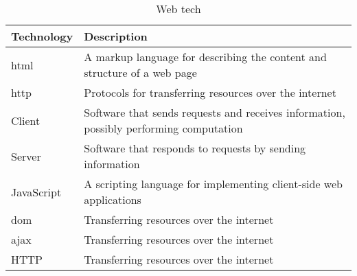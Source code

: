 \begin{table}[H]
	\caption{
		Web tech
	}
	\label{tab:web tech}
	\centering
	\begin{tabular}{ | L{0.2\textwidth} | L{0.7\textwidth} | }
		\hline
		\textbf{Technology}
		& \textbf{Description} \\
		\hline
		\hline
		\acrshort{html}
		& A markup language for describing the content and structure of a web page \\
		\hline
		\acrshort{http}
		& Protocols for transferring resources over the internet \\
		\hline
		Client
		& Software that sends requests and receives information, possibly performing computation \\
		\hline
		Server
		& Software that responds to requests by sending information \\
		\hline
		JavaScript
		& A scripting language for implementing client-side web applications \\
		\hline
		\acrshort{dom}
		& Transferring resources over the internet \\
		\hline
		\acrshort{ajax}
		& Transferring resources over the internet \\
		\hline
		HTTP
		& Transferring resources over the internet \\
		\hline
	\end{tabular}
\end{table}
